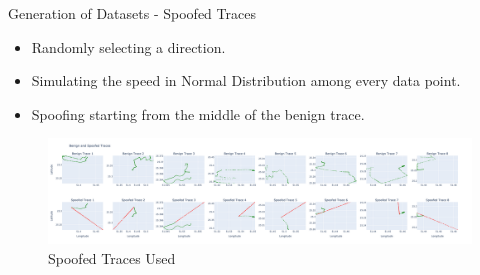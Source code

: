 \documentclass[aspectratio=169, 8pt]{beamer}
\begin{document}
\begin{frame}{Generation of Datasets - Spoofed Traces}

\begin{itemize}
    \item \large{Randomly selecting a direction.}
    \item \large{Simulating the speed in Normal Distribution among every data point.}
    \item \large{Spoofing starting from the middle of the benign trace.}
\end{itemize}

\begin{figure}
    \centering
    \includegraphics[width=\linewidth]{images/traces.png}
    \caption{Spoofed Traces Used }
    \label{fig:enter-label}
\end{figure}

\end{frame}










\end{document}
